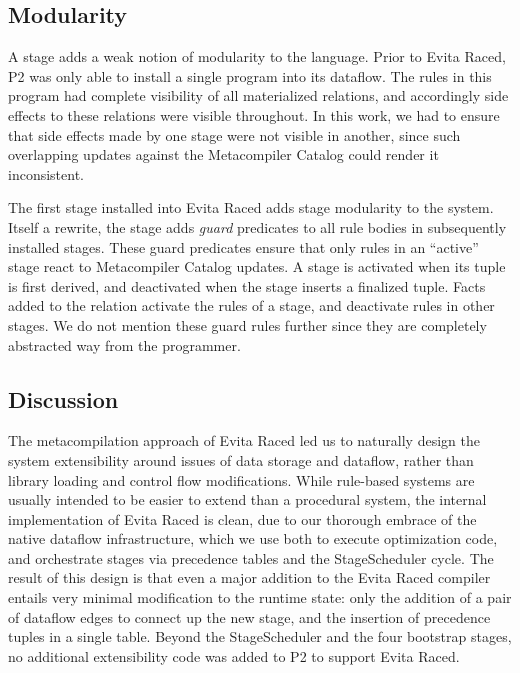 % 



\subsection{Modularity}
\label{ch:evita:sec:modularity}

A stage adds a weak notion of modularity to the \OVERLOG language.  Prior to
Evita Raced, P2 was only able to install a single \OVERLOG program into its
dataflow.  The rules in this program had complete visibility of all
materialized relations, and accordingly side effects to these relations were
visible throughout.  In this work, we had to ensure that side effects made by
one stage were not visible in another, since such overlapping updates against
the Metacompiler Catalog could render it inconsistent.

The first \OVERLOG stage installed into Evita Raced adds stage modularity to
the system.  Itself a rewrite, the stage adds {\em guard} predicates to all
rule bodies in subsequently installed \OVERLOG stages.  These guard predicates
ensure that only rules in an ``active'' stage react to Metacompiler Catalog
updates.  A stage is activated when its  tuple is
first derived, and deactivated when the stage inserts a finalized 
tuple.  Facts added to the  relation activate the rules of a stage,
and deactivate rules in other stages.  We do not mention these guard rules
further since they are completely abstracted way from the programmer.

\subsection{Discussion}

The metacompilation approach of Evita Raced led us to naturally design the
system extensibility around issues of data storage and dataflow, rather than
library loading and control flow modifications.  While rule-based systems are
usually intended to be easier to extend than a procedural system, the internal
implementation of Evita Raced is clean, due to our thorough embrace of the
native dataflow infrastructure, which we use both to execute optimization code,
and orchestrate stages via precedence tables and the StageScheduler cycle.  The
result of this design is that even a major addition to the Evita Raced compiler
entails very minimal modification to the runtime state: only the addition of a
pair of dataflow edges to connect up the new stage, and the insertion of
precedence tuples in a single table.  Beyond the StageScheduler and the four
bootstrap stages, no additional extensibility code was added to P2 to support
Evita Raced.

